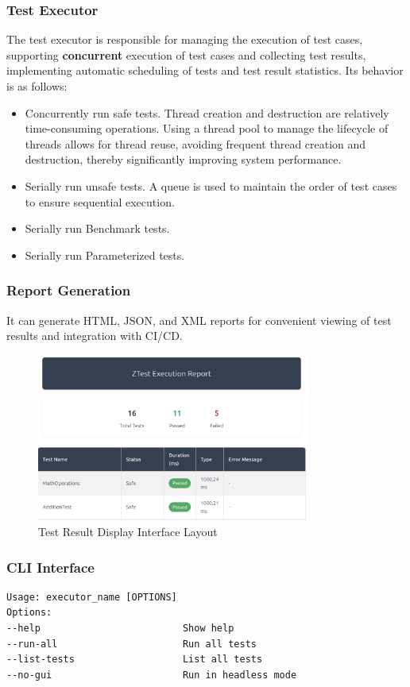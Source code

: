 \documentclass{article}
\begin{document}
\subsubsection{Test Executor}
The test executor is responsible for managing the execution of test cases, supporting \textbf{concurrent} execution of test cases and collecting test results, implementing automatic scheduling of tests and test result statistics.
Its behavior is as follows:
\begin{itemize}
    \item Concurrently run safe tests. Thread creation and destruction are relatively time-consuming operations. Using a thread pool to manage the lifecycle of threads allows for thread reuse, avoiding frequent thread creation and destruction, thereby significantly improving system performance.
    \item Serially run unsafe tests. A queue is used to maintain the order of test cases to ensure sequential execution.
    \item Serially run Benchmark tests.
    \item Serially run Parameterized tests.
\end{itemize}
\subsubsection{Report Generation}
It can generate HTML, JSON, and XML reports for convenient viewing of test results and integration with CI/CD.
\begin{figure}[H]
    \centering
    \includegraphics[width=0.8\textwidth]{img/report.png}
    \caption{Test Result Display Interface Layout}
    \label{fig:report}
    \small
\end{figure}
\subsubsection{CLI Interface}
\begin{framed}
    \begin{lstlisting}
Usage: executor_name [OPTIONS] 
Options: 
--help                         Show help 
--run-all                      Run all tests
--list-tests                   List all tests
--no-gui                       Run in headless mode
\end{lstlisting}
\end{framed}
\end{document}
